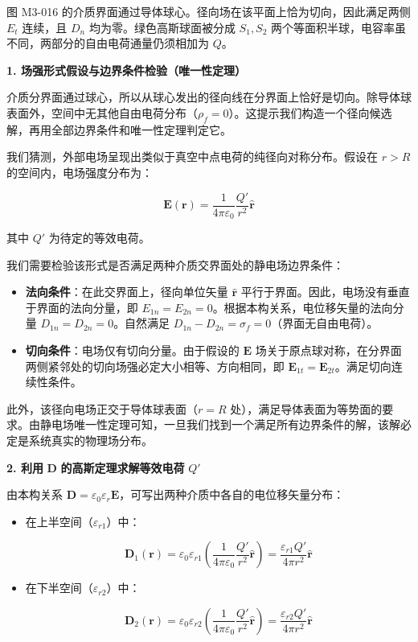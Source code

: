 图 M3-016 的介质界面通过导体球心。径向场在该平面上恰为切向，因此满足两侧
\(E_t\) 连续，且 \(D_n\) 均为零。绿色高斯球面被分成 \(S_1,S_2\)
两个等面积半球，电容率虽不同，两部分的自由电荷通量仍须相加为 \(Q\)。

\textbf{1. 场强形式假设与边界条件检验（唯一性定理）}

介质分界面通过球心，所以从球心发出的径向线在分界面上恰好是切向。除导体球表面外，空间中无其他自由电荷分布（\(\rho_f=0\)）。这提示我们构造一个径向候选解，再用全部边界条件和唯一性定理判定它。

我们猜测，外部电场呈现出类似于真空中点电荷的纯径向对称分布。假设在
\(r > R\) 的空间内，电场强度分布为：

\[
\mathbf{E}(\mathbf{r}) = \frac{1}{4\pi\varepsilon_0} \frac{Q'}{r^2} \hat{\mathbf{r}}
\]

其中 \(Q'\) 为待定的等效电荷。

我们需要检验该形式是否满足两种介质交界面处的静电场边界条件：

\begin{itemize}
\tightlist
\item
  \textbf{法向条件}：在此交界面上，径向单位矢量 \(\hat{\mathbf{r}}\)
  平行于界面。因此，电场没有垂直于界面的法向分量，即
  \(E_{1n} = E_{2n} = 0\)。根据本构关系，电位移矢量的法向分量
  \(D_{1n} = D_{2n} = 0\)。自然满足
  \(D_{1n} - D_{2n} = \sigma_f = 0\)（界面无自由电荷）。
\item
  \textbf{切向条件}：电场仅有切向分量。由于假设的 \(\mathbf{E}\)
  场关于原点球对称，在分界面两侧紧邻处的切向场强必定大小相等、方向相同，即
  \(\mathbf{E}_{1t} = \mathbf{E}_{2t}\)。满足切向连续性条件。
\end{itemize}

此外，该径向电场正交于导体球表面（\(r=R\)
处），满足导体表面为等势面的要求。由静电场唯一性定理可知，一旦我们找到一个满足所有边界条件的解，该解必定是系统真实的物理场分布。

\textbf{2. 利用} \textbf{\(\mathbf{D}\)} \textbf{的高斯定理求解等效电荷}
\textbf{\(Q'\)}

由本构关系
\(\mathbf{D} = \varepsilon_0 \varepsilon_r \mathbf{E}\)，可写出两种介质中各自的电位移矢量分布：

\begin{itemize}
\item
  在上半空间（\(\varepsilon_{r1}\)）中：

  \[
  \mathbf{D}_1(\mathbf{r}) = \varepsilon_0 \varepsilon_{r1} \left( \frac{1}{4\pi\varepsilon_0} \frac{Q'}{r^2} \hat{\mathbf{r}} \right) = \frac{\varepsilon_{r1} Q'}{4\pi r^2} \hat{\mathbf{r}}
  \]
\item
  在下半空间（\(\varepsilon_{r2}\)）中：

  \[
  \mathbf{D}_2(\mathbf{r}) = \varepsilon_0 \varepsilon_{r2} \left( \frac{1}{4\pi\varepsilon_0} \frac{Q'}{r^2} \hat{\mathbf{r}} \right) = \frac{\varepsilon_{r2} Q'}{4\pi r^2} \hat{\mathbf{r}}
  \]
\end{itemize}

